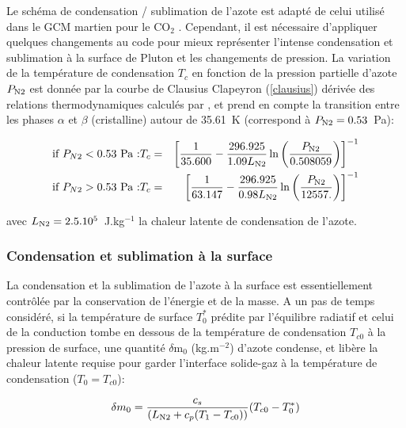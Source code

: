 Le schéma de condensation / sublimation de l’azote est adapté de celui utilisé dans le GCM martien pour le CO$_2$ \citep{Forg:98}. Cependant, il est nécessaire d’appliquer quelques changements au code pour mieux représenter l’intense condensation et sublimation à la surface de Pluton et les changements de pression. 
La variation de la température de condensation $T_c$ en fonction de la pression partielle d’azote $P_{\mbox{\scriptsize N2}}$ est donnée par la courbe de Clausius Clapeyron (\autoref{clausius}) dérivée des relations thermodynamiques calculés par \citet{FraySchm:09}, et prend en compte la transition entre les phases $\alpha$ et $\beta$ (cristalline) autour de 35.61~K (correspond à $P_{\mbox{\scriptsize N2}}=0.53$~Pa):

\begin{eqnarray}
\mbox{if } P_{N2} <0.53 \mbox{ Pa :} & 
T_c  = &  \left[ \frac{1}{35.600} - \frac{296.925}{1.09 L_{\mbox{\scriptsize N2}}} 
\ln{\left( \frac{P_{\mbox{\scriptsize N2}}}{0.508059} \right) } \right]^{-1} 
\\
\mbox{if } P_{N2} >0.53 \mbox{ Pa :} & 
T_c  = & \left[ \frac{1}{63.147} - \frac{296.925}{0.98 L_{\mbox{\scriptsize N2}}} 
\ln{ \left( \frac{P_{\mbox{\scriptsize N2}}}{12557.}\right) } \right] ^{-1} 
\end{eqnarray}

avec $L_{\mbox{\scriptsize N2}} =2.5.10^{5}$~J.kg$^{-1}$ la chaleur latente de condensation de l’azote. 

\subsubsection{Condensation et sublimation à la surface}

La condensation et la sublimation de l’azote à la surface est essentiellement contrôlée par la conservation de l’énergie et de la masse.  
A un pas de temps considéré, si la température de surface $T_0^*$ prédite par l’équilibre radiatif et celui de la conduction tombe en dessous de la température de condensation $T_{c0}$ à la pression de surface, une quantité $\delta$m$_0$ (kg.m$^{-2}$) d’azote condense, et libère la chaleur latente requise pour garder l’interface solide-gaz à la température de condensation ($T_0 = T_{c0}$):

\begin{equation}
\label{eq:condatm}
\delta m_0 = \frac{c_s}{(L_{\mbox{\scriptsize N2}}  +c_p(T_1 -T_{c0}))} (T_{c0} - T^*_0) 
\end{equation}


